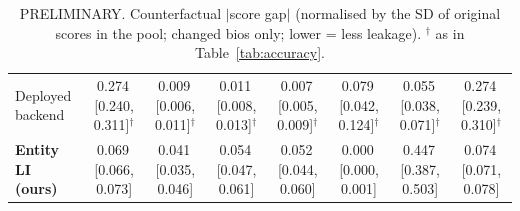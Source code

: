 \begin{table}[t]
{\begin{tabular}{lccccccc}
Deployed backend & 0.274\,{\scriptsize[0.240, 0.311]}$^{\dagger}$ & 0.009\,{\scriptsize[0.006, 0.011]}$^{\dagger}$ & 0.011\,{\scriptsize[0.008, 0.013]}$^{\dagger}$ & 0.007\,{\scriptsize[0.005, 0.009]}$^{\dagger}$ & 0.079\,{\scriptsize[0.042, 0.124]}$^{\dagger}$ & 0.055\,{\scriptsize[0.038, 0.071]}$^{\dagger}$ & 0.274\,{\scriptsize[0.239, 0.310]}$^{\dagger}$ \\
\textbf{Entity LI (ours)} & 0.069\,{\scriptsize[0.066, 0.073]} & 0.041\,{\scriptsize[0.035, 0.046]} & 0.054\,{\scriptsize[0.047, 0.061]} & 0.052\,{\scriptsize[0.044, 0.060]} & 0.000\,{\scriptsize[0.000, 0.001]} & 0.447\,{\scriptsize[0.387, 0.503]} & 0.074\,{\scriptsize[0.071, 0.078]} \\
\bottomrule
\end{tabular}
}
\caption{PRELIMINARY. Counterfactual $|$score gap$|$ (normalised by the SD of original scores in the pool; changed bios only; lower = less leakage). $^\dagger$ as in Table~\ref{tab:accuracy}.}
\label{tab:fairness}
\end{table}

